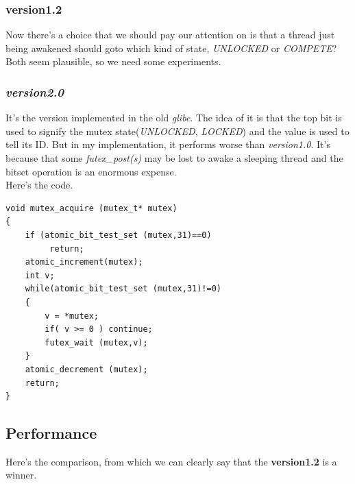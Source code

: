 \documentclass{article}
\begin{document}
		\subsubsection{\textbf{version1.2}}
		Now there's a choice that we should pay our attention on is that a thread just being awakened should goto which kind of state, \textit{UNLOCKED} or \textit{COMPETE}? Both seem plausible, so we need some experiments. \\
		\subsubsection{\textit{version2.0}}
		It's the version implemented in the old \emph{glibc}. The idea of it is that the top bit is used to signify the mutex state(\textit{UNLOCKED}, \textit{LOCKED}) and the value is used to tell its ID. But in my implementation, it performs worse than \emph{version1.0}. It's because that some \textit{futex\_post(s)} may be lost to awake a sleeping thread and the bitset operation is an enormous expense.\\
		Here's the code. \\
		\begin{lstlisting}
void mutex_acquire (mutex_t* mutex)
{
	if (atomic_bit_test_set (mutex,31)==0)
		 return;
	atomic_increment(mutex);
	int v;
	while(atomic_bit_test_set (mutex,31)!=0)
	{
		v = *mutex;
		if( v >= 0 ) continue;
		futex_wait (mutex,v);
	}
	atomic_decrement (mutex);
	return;
}
		\end{lstlisting}  
		\subsection{Performance}
		Here's the comparison, from which we can clearly say that the \textbf{version1.2} is a winner. \\
		\begin{center}
		\end{center}
\end{document}
